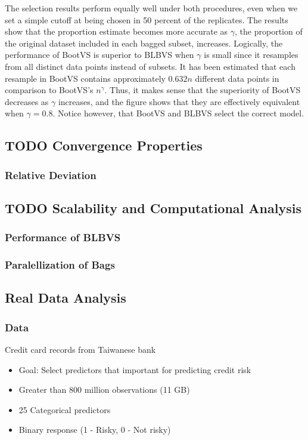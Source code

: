 \documentclass[11pt]{article}
\begin{document}
The selection results perform equally well under both procedures, even when we set a simple cutoff at being chosen in 50 percent of the replicates. The results show that the proportion estimate becomes more accurate as \(\gamma\), the proportion of the original dataset included in each bagged subset, increases. Logically, the performance of BootVS is superior to BLBVS when \(\gamma\) is small since it resamples from all distinct data points instead of subsets. It has been estimated that each resample in BootVS contains approximately \(0.632n\) different data points in comparison to BootVS's \(n^\gamma\). Thus, it makes sense that the superiority of BootVS decreases as \(\gamma\) increases, and the figure shows that they are effectively equivalent when \(\gamma = 0.8\). Notice however, that BootVS and BLBVS select the correct model.

\subsection{{\bfseries\sffamily TODO} Convergence Properties}
\label{sec:org59a98c9}
\subsubsection{Relative Deviation}
\label{sec:orge287779}


\subsection{{\bfseries\sffamily TODO} Scalability and Computational Analysis}
\label{sec:org14cbaa5}
\subsubsection{Performance of BLBVS}
\label{sec:org4133371}
\subsubsection{Paralellization of Bags}
\label{sec:org4783a46}

\subsection{Real Data Analysis}
\label{sec:org715eb6d}
\subsubsection{Data}
\label{sec:org39d6f79}
Credit card records from Taiwanese bank
\begin{itemize}
\item Goal: Select predictors that important for predicting credit risk
\item Greater than 800 million observations (11 GB)
\item 25 Categorical predictors
\item Binary response (1 - Risky, 0 - Not risky)
\end{itemize}
\end{document}
